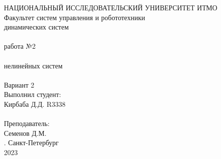 \documentclass[12pt]{article}
\begin{document}
\begin{titlepage}
\begin{center}
    {\small НАЦИОНАЛЬНЫЙ ИССЛЕДОВАТЕЛЬСКИЙ УНИВЕРСИТЕТ ИТМО} \\
    {\small Факультет систем управления и робототехники} \\
    \vspace*{10\baselineskip}
    { динамических систем} \\
    \ \\
    { работа №2} \\
    \ \\
    { нелинейных систем} \\
    \ \\
    Вариант 2 \\
    \vspace*{10\baselineskip}
    \hfill {\small Выполнил студент:} \\
    \hfill {\small Кирбаба Д.Д. R3338} \\
    \ \\
    \hfill {\small Преподаватель:} \\
    \hfill {\small Семенов Д.М.} \\
    \mbox{}
    \vfill {. Санкт-Петербург\\2023}
\end{center}
\end{titlepage}
\end{document}
